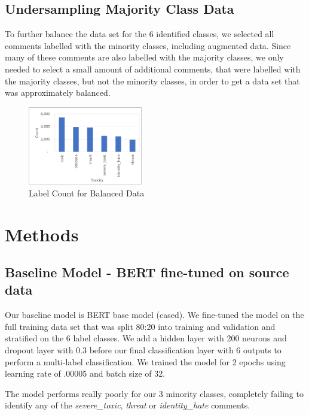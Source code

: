 \documentclass[11pt,a4paper]{article}
\begin{document}
\subsection{Undersampling Majority Class Data}
To further balance the data set for the 6 identified classes, we selected all comments labelled with the minority classes, including augmented data.  Since many of these comments are also labelled with the majority classes, we only needed to select a small amount of additional comments, that were labelled with the majority classes, but not the minority classes, in order to get a data set that was approximately balanced.


\begin{figure}[h!]
\centering
\includegraphics[width=50mm,scale=0.5]{label_counts_balanced.png}
\caption{Label Count for Balanced Data}
\label{Fig2. label count vs toxicity}
\end{figure}


\section{Methods}

\subsection{Baseline Model - BERT fine-tuned on source data}
Our baseline model is BERT base model (cased). We fine-tuned the model on the full training data set that was split 80:20 into training and validation and stratified on the 6 label classes. We add a hidden layer with 200 neurons and dropout layer with 0.3 before our final classification layer with 6 outputs to perform a multi-label classification. We trained the model for 2 epochs using learning rate of .00005 and batch size of 32.

The model performs really poorly for our 3 minority classes, completely failing to identify any of the \emph{severe\_toxic}, \emph{threat} or \emph{identity\_hate} comments.
\end{document}
